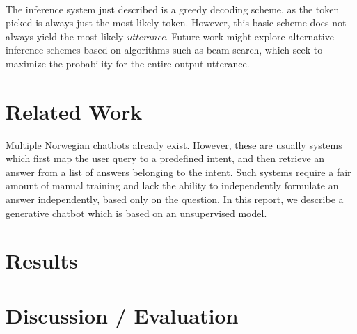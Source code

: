 \documentclass{article}
\begin{document}
\paragraph{}
The inference system just described is a greedy decoding scheme, as the token
picked is always just the most likely token. However, this basic scheme does
not always yield the most likely \emph{utterance}. Future work might explore
alternative inference schemes based on algorithms such as beam search, which
seek to maximize the probability for the entire output utterance.

\subsection*{}


\section*{Related Work}
Multiple Norwegian chatbots already exist. However, these are usually systems
which first map the user query to a predefined intent, and then retrieve an
answer from a list of answers belonging to the intent. Such systems require a
fair amount of manual training and lack the ability to independently formulate
an answer independently, based only on the question.  In this report, we
describe a generative chatbot which is based on an unsupervised model.

\section*{Results}

\section*{Discussion / Evaluation}
\end{document}
